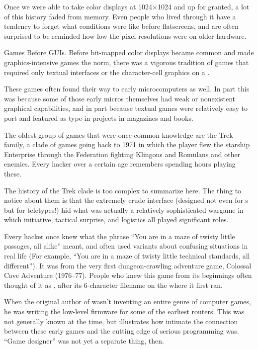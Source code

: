 Once we were able to take color displays at 1024$\times$1024 and up for granted, a lot
of this history faded from memory. Even people who lived through it have a
tendency to forget what conditions were like before flatscreens, and are often
surprised to be reminded how low the pixel resolutions were on older hardware.

\sect Games Before GUIs.
Before bit-mapped color displays became common and made graphics-intensive
games the norm, there was a vigorous tradition of games that required only
textual interfaces or the character-cell graphics on a .

These  games often found their way to early microcomputers as well. In part
this was because some of those early micros themselves had weak or nonexistent
graphical capabilities, and in part because textual games were relatively easy
to port and featured as type-in projects in magazines and books.

The oldest group of games that were once common knowledge are the Trek family,
a clade of games going back to 1971 in which the player flew the starship
Enterprise through the Federation fighting Klingons and Romulans and other
enemies. Every hacker over a certain age remembers spending hours playing
these.

The history of the Trek clade is too complex to summarize here. The thing to
notice about them is that the extremely crude interface (designed not even for
s but for teletypes!) hid what was actually a relatively sophisticated
wargame in which initiative, tactical surprise, and logistics all played
significant roles.

Every hacker once knew what the phrase ``You are in a maze of twisty little
passages, all alike'' meant, and often used variants about confusing situations
in real life (For example, ``You are in a maze of twisty little technical
standards, all different''). It was from the very first dungeon-crawling
adventure game, Colossal Cave Adventure (1976--77). People who knew this game
from its beginnings often thought of it as , after its 6-character
filename on the  where it first ran.

When the original author of  wasn't inventing an entire genre of computer
games, he was writing the low-level firmware for some of the earliest 
routers. This was not generally known at the time, but illustrates how intimate
the connection between these early games and the cutting edge of serious
programming was. ``Game designer'' was not yet a separate thing, then.

